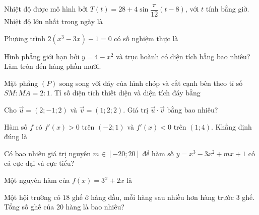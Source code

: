 \begin{ex}
Nhiệt độ được mô hình bởi $T(t)=28+4\sin\dfrac{\pi}{12}(t-8)$, với $t$ tính bằng giờ. Nhiệt độ lớn nhất trong ngày là
\end{ex}

\begin{ex}
Phương trình $2(x^3-3x)-1=0$ có số nghiệm thực là
\end{ex}

\begin{ex}
Hình phẳng giới hạn bởi $y=4-x^2$ và trục hoành có diện tích bằng bao nhiêu? Làm tròn đến hàng phần mười.
\end{ex}

\begin{ex}
Mặt phẳng $(P)$ song song với đáy của hình chóp và cắt cạnh bên theo tỉ số $SM:MA=2:1$. Tỉ số diện tích thiết diện và diện tích đáy bằng
\end{ex}

\begin{ex}
Cho $\vec u=(2;-1;2)$ và $\vec v=(1;2;2)$. Giá trị $\vec u\cdot\vec v$ bằng bao nhiêu?
\end{ex}

\begin{ex}
Hàm số $f$ có $f'(x)>0$ trên $(-2;1)$ và $f'(x)<0$ trên $(1;4)$. Khẳng định đúng là
\end{ex}

\begin{ex}
Có bao nhiêu giá trị nguyên $m\in[-20;20]$ để hàm số $y=x^3-3x^2+mx+1$ có cả cực đại và cực tiểu?
\end{ex}

\begin{ex}
Một nguyên hàm của $f(x)=3^x+2x$ là
\end{ex}

\begin{ex}
Một hội trường có $18$ ghế ở hàng đầu, mỗi hàng sau nhiều hơn hàng trước $3$ ghế. Tổng số ghế của $20$ hàng là bao nhiêu?
\end{ex}

